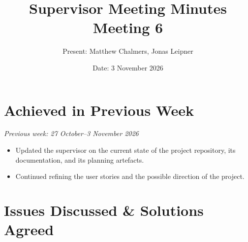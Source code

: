 \documentclass[12pt,a4paper]{article}
\title{\textbf{Supervisor Meeting Minutes}\\Meeting 6}
\author{Present: Matthew Chalmers, Jonas Leipner}
\date{Date: 3 November 2026}
\begin{document}
\maketitle

\section{Achieved in Previous Week}

\noindent\textit{Previous week: 27 October--3 November 2026}
\begin{itemize}[leftmargin=*]
    \item Updated the supervisor on the current state of the project repository,
    its documentation, and its planning artefacts.
    \item Continued refining the user stories and the possible direction of the
    project.
\end{itemize}

\section{Issues Discussed \& Solutions Agreed}
\end{document}
